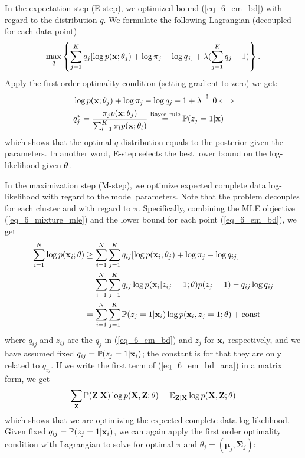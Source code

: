 \documentclass[../main.tex]{subfiles}
\begin{document}
\par In the expectation step (E-step), we optimized bound (\ref{eq_6_em_bd}) with regard to the distribution $q$. We formulate the following Lagrangian (decoupled for each data point)
\begin{equation*}
\max_{q}\left\{\sum_{j=1}^{K}q_j[\log p({\bf x};\theta_j) +\log \pi_j - \log q_j] +\lambda (\sum_{j=1}^{K}q_j -1) \right\}.
\end{equation*}
Apply the first order optimality condition (setting gradient to zero) we get:
\begin{align*}
&\log p({\bf x};\theta_j) +\log \pi_j - \log q_j - 1 +\lambda \overset{!}{=}0 \Longleftrightarrow\\
&q_j^*=\frac{\pi_jp({\bf x};\theta_j)}{\sum_{l=1}^{K}\pi_lp({\bf x};\theta_l)}\overset{\rm Bayes\ rule}{=}\mathbb{P}(z_j=1|{\bf x})
\end{align*} 
which shows that the optimal $q$-distribution equals to the posterior given the parameters. In another word, E-step selects the best lower bound on the log-likelihood given ${\bf \theta}$.
\par In the maximization step (M-step), we optimize expected complete data log-likelihood with regard to the model parameters. Note that the problem decouples for each cluster and with regard to $\pi$. Specifically, combining the MLE objective (\ref{eq_6_mixture_mle}) and the lower bound for each point (\ref{eq_6_em_bd}), we get
\begin{align}
\label{eq_6_em_bd_cplt}\sum_{i=1}^{N}\log p({\bf x}_i;\theta) &\geq \sum_{i=1}^{N}\sum_{j=1}^{K}q_{ij}[\log p({\bf x}_i;\theta_j) +\log \pi_j - \log q_{ij}]\\
&=\sum_{i=1}^{N}\sum_{j=1}^{K}q_{ij}\log p({\bf x}_i|z_{ij}=1;\theta)p(z_j=1) -q_{ij}\log q_{ij}\notag\\
\label{eq_6_em_bd_ana}&=\sum_{i=1}^{N}\sum_{j=1}^{K}\mathbb{P}(z_j=1|{\bf x}_i)\log p({\bf x}_i,z_j=1;\theta) +{\rm const}
\end{align}
where $q_{ij}$ and $z_{ij}$ are the $q_j$ in (\ref{eq_6_em_bd}) and $z_j$ for ${\bf x}_i$ respectively, and we have assumed fixed $q_{ij} = \mathbb{P}(z_j=1|{\bf x}_i)$; the constant is for that they are only related to $q_{ij}$. If we write the first term of (\ref{eq_6_em_bd_ana}) in a matrix form, we get
\begin{equation*}
\sum_{\bf Z}\mathbb{P}({\bf Z}|{\bf X})\log p({\bf X,Z};\theta)=\mathbb{E}_{\bf Z|X}\log p({\bf X,Z};\theta)
\end{equation*}
which shows that we are optimizing the expected complete data log-likelihood. Given fixed $q_{ij} = \mathbb{P}(z_j=1|{\bf x}_i)$, we can again apply the first order optimality condition with Lagrangian to solve for optimal $\pi$ and $ \theta_j = (\bm{\mu}_j,\bm{\Sigma}_j)$:
\end{document}
